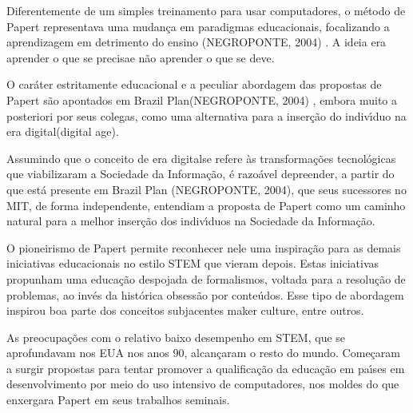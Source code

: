 \documentclass[
12pt,		%
openright,	%
twoside,  %
a4paper,			%
chapter=TITLE,		%
english,			%
french,				%
spanish,			%
brazil				%
]{USPSC-classe/USPSC}
\begin{document}
Diferentemente de um simples treinamento para usar computadores, o m\'etodo de Papert representava uma mudan\c{c}a em paradigmas educacionais, focalizando a aprendizagem em detrimento do ensino  (NEGROPONTE, 2004) . A ideia era \textquotedbl aprender o que se precisa\textquotedbl  e n\~ao \textquotedbl aprender o que se deve\textquotedbl .









O car\'ater estritamente educacional e a peculiar abordagem das propostas de Papert s\~ao apontados em \textquotedbl Brazil Plan\textquotedbl   (NEGROPONTE, 2004) , embora muito a posteriori por seus colegas, como uma alternativa para a inser\c{c}\~ao do indiv\'{\i}duo na \textquotedbl era digital\textquotedbl  (digital age).









Assumindo que o conceito de \textquotedbl era digital\textquotedbl  se refere \`as transforma\c{c}\~oes tecnol\'ogicas que viabilizaram a  \textquotedbl Sociedade da Informa\c{c}\~ao\textquotedbl ,  \'e razo\'avel depreender, a partir do que est\'a presente em Brazil Plan  (NEGROPONTE, 2004), que seus sucessores no MIT, de forma independente, entendiam a proposta de Papert como um caminho natural para a melhor inser\c{c}\~ao dos indiv\'{\i}duos na Sociedade da Informa\c{c}\~ao.









O pioneirismo de Papert permite reconhecer nele uma inspira\c{c}\~ao para as demais iniciativas educacionais no estilo STEM que vieram depois. Estas iniciativas propunham uma educa\c{c}\~ao despojada de formalismos, voltada para a resolu\c{c}\~ao de problemas, ao inv\'es da hist\'orica obsess\~ao por conte\'udos. Esse tipo de abordagem inspirou boa parte dos conceitos subjacentes  \textquotedbl maker culture\textquotedbl , entre outros.









As preocupa\c{c}\~oes com o relativo baixo desempenho em STEM, que se aprofundavam nos EUA nos anos 90, alcan\c{c}aram o resto do mundo. Come\c{c}aram a surgir propostas para tentar promover a qualifica\c{c}\~ao da educa\c{c}\~ao em pa\'{\i}ses em desenvolvimento por meio do uso intensivo de computadores, nos moldes do que enxergara Papert em seus trabalhos seminais.
\end{document}
